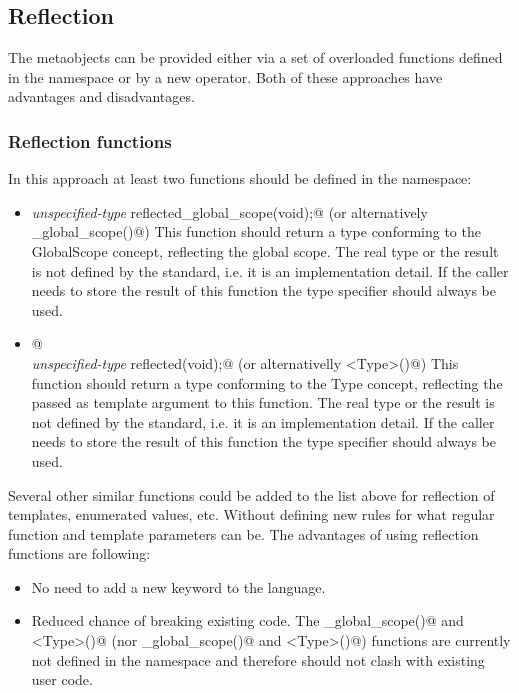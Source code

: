 \subsection{Reflection}

The metaobjects can be provided either via a set of overloaded
functions defined in the \verb@std@ namespace or by a new operator.
Both of these approaches have advantages and disadvantages.

\subsubsection{Reflection functions}

In this approach at least two functions should be defined
in the \verb@std@ namespace:

\begin{itemize}
	\item{{\em unspecified-type} \verb@ reflected_global_scope(void);@} (or
	alternatively \verb@mirrored_global_scope()@)
	This function should return a type conforming to the {\metaobject GlobalScope}
	concept, reflecting the global scope.
	The real type or the result is not defined by the standard, i.e. it is an implementation detail. 
	If the caller needs to store the result of this function the \verb@auto@ type
	specifier should always be used.

	\item{\verb@template <typename Type>@\\
	{\em unspecified-type} \verb@ reflected(void);@} (or alternativelly \verb@mirrored<Type>()@)
	This function should return a type conforming to the {\metaobject Type}
	concept, reflecting the \verb@Type@ passed as template argument to this function.
	The real type or the result is not defined by the standard, i.e. it is an implementation detail. 
	If the caller needs to store the result of this function the \verb@auto@ type
	specifier should always be used.
\end{itemize}

Several other similar functions could be added to the list above
for reflection of templates, enumerated values, etc. Without defining
new rules for what regular function and template parameters can be.
The advantages of using reflection functions are following:

\begin{itemize}
	\item No need to add a new keyword to the language.

	\item Reduced chance of breaking existing code. The \verb@reflected_global_scope()@
	and \verb@reflected<Type>()@ (nor \verb@mirrored_global_scope()@ and 
	\verb@mirrored<Type>()@) functions are currently not defined in the \verb@std@
	namespace and therefore should not clash with existing user code.
\end{itemize}

